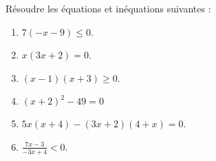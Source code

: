 
\begin{exercice}\label{exosmath-0433}

    Résoudre les équations et inéquations suivantes :
    \begin{multicols}{2}
        \begin{enumerate}
            \item
                \( 7(-x-9)\leq 0\).
            \item
                \( x(3x+2)=0\).
            \item
            \( (x-1)(x+3)\geq 0\).
            \item
                \( (x+2)^2-49=0\)
            \item
                \( 5x(x+4)-(3x+2)(4+x)=0\).
            \item
                \( \frac{ 7x-3 }{ -3x+4 }<0\).
        \end{enumerate}
    \end{multicols}

\end{exercice}
